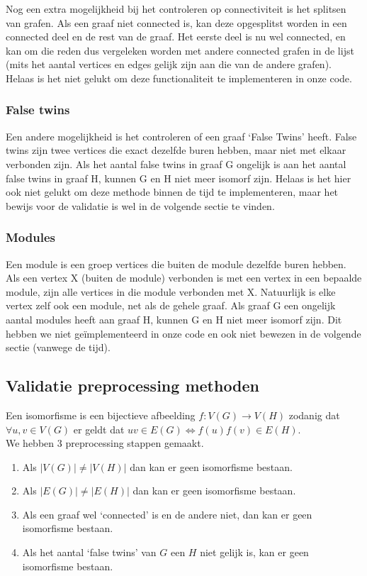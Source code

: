 \documentclass{article}
\begin{document}
Nog een extra mogelijkheid bij het controleren op connectiviteit is het splitsen van grafen. Als een graaf niet connected is, kan deze opgesplitst worden in een connected deel en de rest van de graaf. Het eerste deel is nu wel connected, en kan om die reden dus vergeleken worden met andere connected grafen in de lijst (mits het aantal vertices en edges gelijk zijn aan die van de andere grafen). Helaas is het niet gelukt om deze functionaliteit te implementeren in onze code.

\subsubsection{False twins}
Een andere mogelijkheid is het controleren of een graaf `False Twins' heeft. False twins zijn twee vertices die exact dezelfde buren hebben, maar niet met elkaar verbonden zijn. Als het aantal false twins in graaf G ongelijk is aan het aantal false twins in graaf H, kunnen G en H niet meer isomorf zijn. Helaas is het hier ook niet gelukt om deze methode binnen de tijd te implementeren, maar het bewijs voor de validatie is wel in de volgende sectie te vinden.

\subsubsection{Modules}
Een module is een groep vertices die buiten de module dezelfde buren hebben. Als een vertex X (buiten de module) verbonden is met een vertex in een bepaalde module, zijn alle vertices in die module verbonden met X. Natuurlijk is elke vertex zelf ook een module, net als de gehele graaf. Als graaf G een ongelijk aantal modules heeft aan graaf H, kunnen G en H niet meer isomorf zijn. Dit hebben we niet ge\"implementeerd in onze code en ook niet bewezen in de volgende sectie (vanwege de tijd).

\subsection{Validatie preprocessing methoden}

Een isomorfisme is een bijectieve afbeelding $f:V(G) \rightarrow V(H)$ zodanig dat $\forall u,v \in V(G)$ er geldt dat $uv \in E(G) \Leftrightarrow f(u)f(v)\in E(H)$.\\

We hebben 3 preprocessing stappen gemaakt.
\begin{enumerate}
\item Als $|V(G)|\neq|V(H)|$ dan kan er geen isomorfisme bestaan.
\item Als $|E(G)|\neq|E(H)|$ dan kan er geen isomorfisme bestaan.
\item Als een graaf wel `connected' is en de andere niet, dan kan er geen isomorfisme bestaan.
\item Als het aantal `false twins' van $G$ een $H$ niet gelijk is, kan er geen isomorfisme bestaan.
\end{enumerate}
\end{document}

